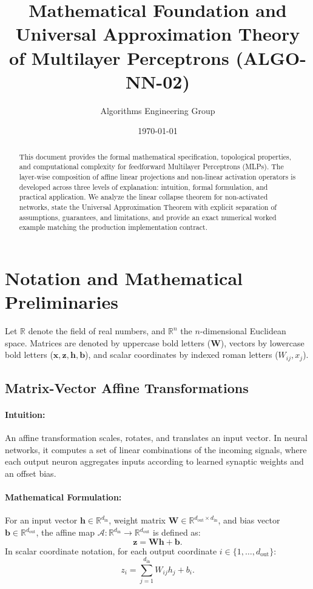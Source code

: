\documentclass[11pt]{article}
\title{Mathematical Foundation and Universal Approximation Theory of Multilayer Perceptrons (ALGO-NN-02)}
\author{Algorithms Engineering Group}
\date{\today}
\begin{document}
\maketitle

\begin{abstract}
This document provides the formal mathematical specification, topological properties, and computational complexity for feedforward Multilayer Perceptrons (MLPs). The layer-wise composition of affine linear projections and non-linear activation operators is developed across three levels of explanation: intuition, formal formulation, and practical application. We analyze the linear collapse theorem for non-activated networks, state the Universal Approximation Theorem with explicit separation of assumptions, guarantees, and limitations, and provide an exact numerical worked example matching the production implementation contract.
\end{abstract}

\section{Notation and Mathematical Preliminaries}
\label{sec:notation}

Let $\mathbb{R}$ denote the field of real numbers, and $\mathbb{R}^n$ the $n$-dimensional Euclidean space. Matrices are denoted by uppercase bold letters ($\mathbf{W}$), vectors by lowercase bold letters ($\mathbf{x}, \mathbf{z}, \mathbf{h}, \mathbf{b}$), and scalar coordinates by indexed roman letters ($W_{ij}, x_j$).

\subsection{Matrix-Vector Affine Transformations}
\paragraph{Intuition:} An affine transformation scales, rotates, and translates an input vector. In neural networks, it computes a set of linear combinations of the incoming signals, where each output neuron aggregates inputs according to learned synaptic weights and an offset bias.

\paragraph{Mathematical Formulation:}
For an input vector $\mathbf{h} \in \mathbb{R}^{d_{\text{in}}}$, weight matrix $\mathbf{W} \in \mathbb{R}^{d_{\text{out}} \times d_{\text{in}}}$, and bias vector $\mathbf{b} \in \mathbb{R}^{d_{\text{out}}}$, the affine map $\mathcal{A}: \mathbb{R}^{d_{\text{in}}} \to \mathbb{R}^{d_{\text{out}}}$ is defined as:
\begin{equation}
\label{eq:affine_map}
\mathbf{z} = \mathbf{W} \mathbf{h} + \mathbf{b}.
\end{equation}
In scalar coordinate notation, for each output coordinate $i \in \{1, \dots, d_{\text{out}}\}$:
\begin{equation}
z_i = \sum_{j=1}^{d_{\text{in}}} W_{ij} h_j + b_i.
\end{equation}
\end{document}

